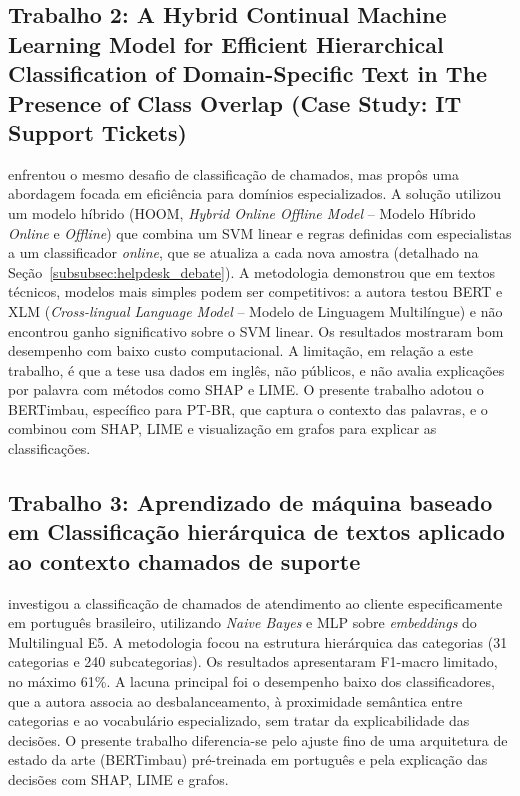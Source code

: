 \documentclass[
    12pt,                %
    openright,           %
    oneside,             %
    a4paper,             %
    english,             %
    brazil               %
]{abntex2}
\begin{document}
\subsection{Trabalho 2: A Hybrid Continual Machine Learning Model for Efficient Hierarchical Classification of Domain-Specific Text in The Presence of Class Overlap (Case Study: IT Support Tickets)}

 enfrentou o mesmo desafio de classificação de chamados, 
mas propôs uma abordagem focada em eficiência para domínios especializados. 
A solução utilizou um modelo híbrido (HOOM, \textit{Hybrid Online Offline Model} -- Modelo Híbrido \textit{Online} e \textit{Offline}) que combina um SVM linear e regras definidas com especialistas a um classificador \textit{online}, que se atualiza a cada nova amostra (detalhado na Seção~\ref{subsubsec:helpdesk_debate}). A metodologia 
demonstrou que em textos técnicos, modelos mais simples podem ser competitivos: 
a autora testou BERT e XLM (\textit{Cross-lingual Language Model} -- Modelo de Linguagem Multilíngue) e não encontrou ganho significativo sobre o SVM linear. 
Os resultados mostraram bom desempenho com baixo custo computacional. A limitação, 
em relação a este trabalho, é que a tese usa dados em inglês, não públicos, e não 
avalia explicações por palavra com métodos como SHAP e LIME. O presente trabalho 
adotou o BERTimbau, específico para PT-BR, que captura o contexto das palavras, 
e o combinou com SHAP, LIME e visualização em grafos para explicar as classificações.

\subsection{Trabalho 3: Aprendizado de máquina baseado em Classificação hierárquica de textos aplicado ao contexto chamados de suporte}

 investigou a classificação de chamados de atendimento ao cliente especificamente em português brasileiro, utilizando \textit{Naive Bayes} e MLP sobre \textit{embeddings} do Multilingual E5. A metodologia focou na estrutura hierárquica das categorias (31 categorias e 240 subcategorias). Os resultados apresentaram F1-macro limitado, no máximo 61\%. A lacuna principal foi o desempenho baixo dos classificadores, que a autora associa ao desbalanceamento, à proximidade semântica entre categorias e ao vocabulário especializado, sem tratar da explicabilidade das decisões. O presente trabalho diferencia-se pelo ajuste fino de uma arquitetura de estado da arte (BERTimbau) pré-treinada em português e pela explicação das decisões com SHAP, LIME e grafos.
\end{document}
